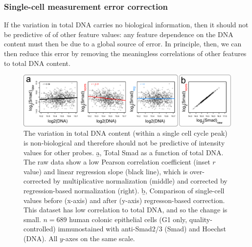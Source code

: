 \subsubsection{Single-cell measurement error correction}
\label{imaging:singleCellCorrection}

If the variation in total DNA carries no biological
information, then it should not be predictive of
of other feature values: any feature dependence on
the DNA content must then be due to a global source
of error. In principle, then, we can then reduce this error by 
removing the meaningless correlations of other features to total DNA content. 


  \begin{figure}[!bt]
  \centering
  \includegraphics[width=6in]{FIGS/imaging/singleCellNorm.pdf}
  {\singlespacing 
  \caption[ Single-cell correction using DNA features.]
            {The variation in total DNA content (within a single cell cycle peak)
            is non-biological and therefore should not be predictive of
            intensity values for other probes.
            \b{a}, Total Smad as a function of
            total DNA. The raw data show a low
            Pearson correlation coefficient (inset $r$ value)
            and linear regression slope (black line),
            which is over-corrected by
            multiplicative normalization (middle) and
            corrected by regression-based normalization
            (right). \b{b}, Comparison of single-cell values
            before (x-axis) and after (y-axis) regresson-based
            correction. This dataset has low correlation to
            total DNA, and so the change is small. 
            $n=689$ human colonic epithelial cells (G1 only,
            quality-controlled) immunostained
            with anti-Smad2/3 (Smad) and Hoechst (DNA).
            All $y$-axes on the same scale.}
  \label{fig:imaging:singleCellNorm}}
  \end{figure}

